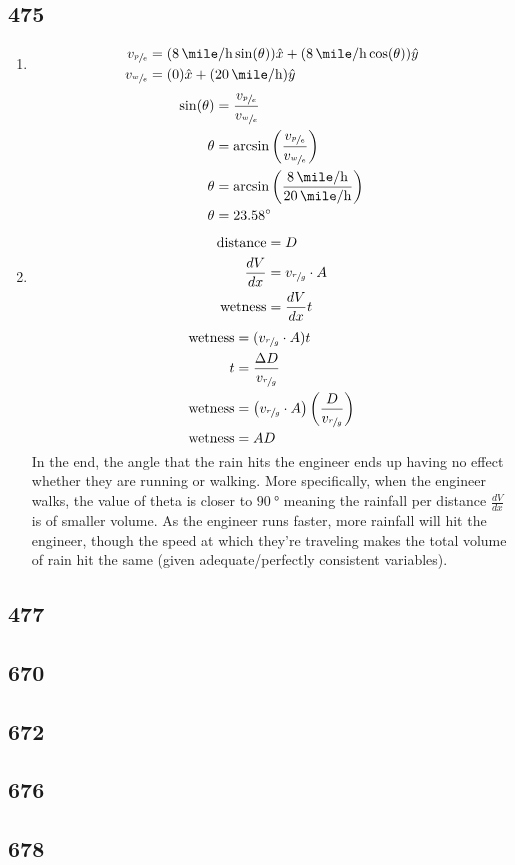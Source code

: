 \documentclass{article}
\begin{document}
\subsection{475}
\begin{enumerate}[label=\textbf{(a)}]
	\item
		\begin{align*}
			v_{\sfrac{p}{e}} & = (\SI{8}{\mile \per \hour}\sin(\theta))\hat{x} + (\SI{8}{\mile \per \hour}\cos(\theta))\hat{y} \\
			v_{\sfrac{w}{e}} & = (0)\hat{x} + (\SI{20}{\mile \per \hour})\hat{y}
		\end{align*}
		\begin{align*}
			\sin(\theta) & = \frac{v_{\sfrac{p}{e}}}{v_{\sfrac{w}{e}}} \\
			\theta & = \arcsin \left( \frac{v_{\sfrac{p}{e}}}{v_{\sfrac{w}{e}}} \right) \\
			\theta & = \arcsin \left( \frac{\SI{8}{\mile \per \hour}}{\SI{20}{\mile \per \hour}} \right) \\
			\theta & = \SI{23.58}{\degree}
		\end{align*}
	\item
		\begin{align*}
			\text{distance} & = D \\
			\frac{dV}{dx} & = v_{\sfrac{r}{g}} \cdot A \\
			\text{wetness} & = \frac{dV}{dx}t
		\end{align*}
		\begin{align*}
			\text{wetness} & = (v_{\sfrac{r}{g}} \cdot A)t \\
			t & = \frac{\Delta D}{v_{\sfrac{r}{g}}} \\
			\text{wetness} & = \left( v_{\sfrac{r}{g}} \cdot A \right) \left( \frac{D}{v_{\sfrac{r}{g}}} \right) \\
			\text{wetness} & = AD
		\end{align*}
		In the end, the angle that the rain hits the engineer ends up having no effect whether they are running or walking. More specifically, when the engineer walks, the value of theta is closer to $ \SI{90}{\degree} $ meaning the rainfall per distance $ \frac{dV}{dx} $ is of smaller volume. As the engineer runs faster, more rainfall will hit the engineer, though the speed at which they're traveling makes the total volume of rain hit the same (given adequate/perfectly consistent variables).
\end{enumerate}

\subsection{477}

\subsection{670}

\subsection{672}

\subsection{676}

\subsection{678}
\end{document}
